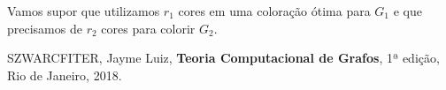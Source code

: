 \documentclass{homework}
\begin{document}
	\quest Vamos supor que utilizamos $r_1$ cores em uma coloração ótima para $G_1$ e que precisamos de $r_2$ cores para colorir $G_2$.
	
	\quest
	\begin{thebibliography}{10}
		 SZWARCFITER, Jayme Luiz, \textbf{Teoria Computacional de Grafos}, 1ª edição, Rio de Janeiro, 2018.
	\end{thebibliography}
	
\end{document}
